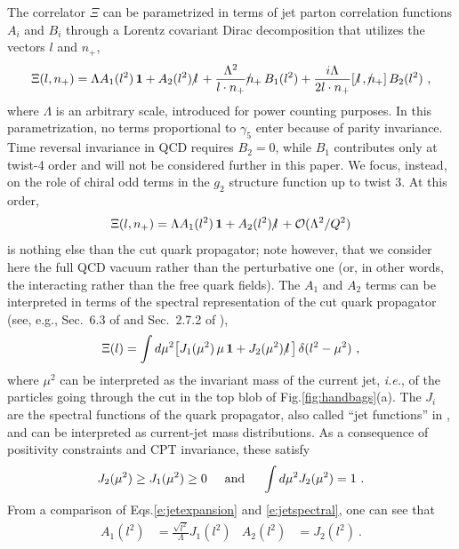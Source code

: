 \documentclass[preprintnumbers,floatfix,nofootinbib]{revtex4}
\newcommand{\lslash}{l \hspace{-0.19cm} / \,}
\newcommand{\nslash}{n \hspace{-0.24cm} / \,}
\newcommand{\id}{{\bm 1}
}
\begin{document}
The correlator $\Xi$ can be parametrized in terms of jet parton correlation
functions $A_i$ and $B_i$ through a Lorentz covariant Dirac decomposition that utilizes the vectors $l$ and $n_+$, 
\begin{equation}
\Xi(l,n_+) = \Lambda A_1(l^2)\,\id + A_2(l^2)\,\lslash 
+ \frac{\Lambda^2}{l \cdot n_{+}} \nslash_+ \, B_{1}(l^2)
+ \frac{i \Lambda}{2 l \cdot n_{+}} [\,\lslash,\nslash_+ ] \, B_{2}(l^2) \ ,
\label{e:jetexpansion}
\end{equation} 
where $\Lambda$ is an arbitrary scale, introduced for power counting purposes.
In this parametrization, no terms proportional to $\gamma_5$ enter because of parity invariance. Time reversal invariance in QCD requires $B_{2}=0$, while $B_{1}$ contributes only at twist-4 order and will not be considered further in this paper. We focus, instead, on the role of chiral odd terms in the $g_2$ structure function up to twist 3. At this order, 
\begin{equation}
  \Xi(l,n_+) = \Lambda A_1(l^2)\,\id + A_2(l^2)\,\lslash 
    + {\cal O}(\Lambda^2/Q^2)
\label{e:jetexpansion-tw3}
\end{equation} 
is nothing else than the cut quark propagator; note however, that we consider
here the full QCD vacuum rather than the perturbative one (or, in other words, the interacting rather than the free quark fields).
The $A_1$ and $A_2$ terms can be interpreted in terms of the spectral
representation of the cut quark propagator (see, e.g., Sec.~6.3 of
\cite{D'Hoker:2004aa} and Sec.~2.7.2 of \cite{Romao:2013aa}),
\begin{align} 
  \Xi(l) =  
  \int d \mu^2 \big[ J_1 (\mu^2)\,\mu\,\id + J_2 (\mu^2)\,\lslash \big] \,
  \delta(l^2 -\mu^2) \ ,
\label{e:jetspectral}
\end{align}
where $\mu^2$ can be interpreted as the invariant mass of the current jet, {\it
  i.e.}, of the particles going through the cut in the top blob of
Fig.\ref{fig:handbags}(a). The $J_i$ are the spectral functions of the
quark propagator, also called ``jet functions'' in
\cite{Accardi:2008ne}, and can be interpreted as current-jet mass distributions. As a consequence of positivity constraints and CPT invariance, these satisfy \cite{D'Hoker:2004aa,Romao:2013aa,Weinberg:1995mt}
\begin{align}
  J_2(\mu^2) \geq J_1(\mu^2) \geq 0
  \hspace*{0.5cm} \text{and} \hspace*{0.5cm}
  \int d\mu^2 J_2(\mu^2) = 1 \ .
\label{eq:jetfnsprops}
\end{align}
From a comparison of Eqs.\eqref{e:jetexpansion} and \eqref{e:jetspectral}, one can see that 
\begin{align}
  A_1(l^2)&=\frac{\sqrt{l^2}}{\Lambda}J_1(l^2) & A_2(l^2)&=J_2(l^2) \ .
  \label{eq:jet_vs_spectral}
\end{align}
\end{document}
